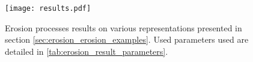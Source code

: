 \clearpage
\begin{figure}
	\centering
    \texttt{[image: results.pdf]}
	\caption{Erosion processes results on various representations presented in section \cref{sec:erosion_erosion_examples}. Used parameters used are detailed in  \cref{tab:erosion_result_parameters}.}
	\label{tab:erosion_result_figures}
\end{figure}
